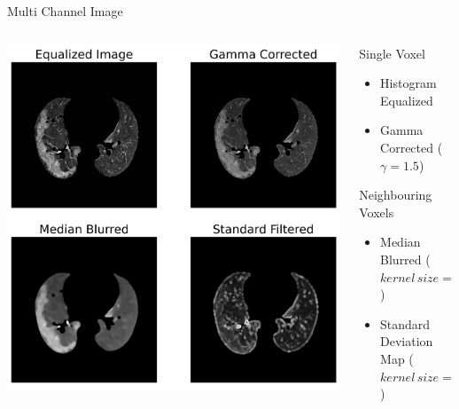 \documentclass{standalone}
\begin{document}
	\begin{frame}{Multi Channel Image}
			\begin{columns}
			\begin{column}{.6\textwidth}
				\centering\includegraphics[scale=.33]{./img/Multi_Channel.png}
				\vspace{.2cm}			
			\end{column}
			\begin{column}{.3\textwidth}
				\begin{block}{Single Voxel}
					\begin{itemize}\setlength\itemsep{0.5em}
						\item Histogram Equalized 
						\item Gamma Corrected ($\gamma = 1.5$)
					\end{itemize}			
				\end{block}
				\begin{block}{Neighbouring Voxels}
					\begin{itemize}\setlength\itemsep{0.5em}
						\item Median Blurred ($kernel\, size = 11$)
						\item Standard Deviation Map ($kernel\, size = 3$)						
					\end{itemize}
				\end{block}
					

\end{column}
\end{columns}
\end{frame}
\end{document}
